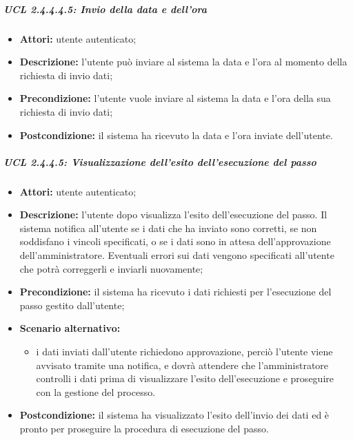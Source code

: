 \subparagraph{UCL 2.4.4.4.5: Invio della data e dell'ora}
\begin{itemize}
\item \textbf{Attori:} utente autenticato;
\item \textbf{Descrizione:} l'utente può inviare al sistema la data e l'ora al momento della richiesta di invio dati;
\item \textbf{Precondizione:} l'utente vuole inviare al sistema la data e l'ora della sua richiesta di invio dati;
\item \textbf{Postcondizione:} il sistema ha ricevuto la data e l'ora inviate dell'utente.
\end{itemize}

\subparagraph{UCL 2.4.4.5: Visualizzazione dell'esito dell'esecuzione del passo}
\begin{itemize}
\item \textbf{Attori:} utente autenticato;
\item \textbf{Descrizione:} l'utente dopo visualizza l'esito dell'esecuzione del passo. Il sistema notifica all'utente se i dati che ha inviato sono corretti, se non soddisfano i vincoli specificati, o se i dati sono in attesa dell'approvazione dell'amministratore.
Eventuali errori sui dati vengono specificati all'utente che potrà correggerli e inviarli nuovamente; 
\item \textbf{Precondizione:} il sistema ha ricevuto i dati richiesti per l'esecuzione del passo gestito dall'utente;
\item \textbf{Scenario alternativo:}
\begin{itemize}
\item i dati inviati dall'utente richiedono approvazione, perciò l'utente viene avvisato tramite una notifica, e dovrà attendere che l'amministratore controlli i dati prima di visualizzare l'esito dell'esecuzione e proseguire con la gestione del processo.
\end{itemize}
\item \textbf{Postcondizione:} il sistema ha visualizzato l'esito dell'invio dei dati ed è pronto per proseguire la procedura di esecuzione del passo.
\end{itemize}

